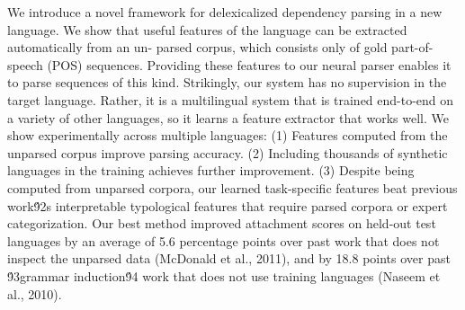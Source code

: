 We introduce a novel framework for delexicalized dependency parsing in a new language. We show that useful features of the language can be extracted automatically from an un- parsed corpus, which consists only of gold part-of-speech (POS) sequences. Providing these features to our neural parser enables it to parse sequences of this kind. Strikingly, our system has no supervision in the target language. Rather, it is a multilingual system that is trained end-to-end on a variety of other languages, so it learns a feature extractor that works well. We show experimentally across multiple languages: (1) Features computed from the unparsed corpus improve parsing accuracy. (2) Including thousands of synthetic languages in the training achieves further improvement. (3) Despite being computed from unparsed corpora, our learned task-specific features beat previous work\'92s interpretable typological features that require parsed corpora or expert categorization. Our best method improved attachment scores on held-out test languages by an average of 5.6 percentage points over past work that does not inspect the unparsed data (McDonald et al., 2011), and by 18.8 points over past \'93grammar induction\'94 work that does not use training languages (Naseem et al., 2010).
